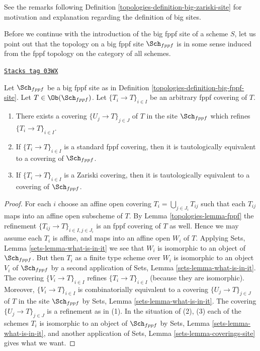 See the remarks following Definition \ref{topologies-definition-big-zariski-site}
for motivation and explanation regarding the definition of big sites.

\medskip\noindent
Before we continue with the introduction of the big fppf site of
a scheme $S$, let us point out that the topology on a big fppf site
$\Sch_{fppf}$ is in some sense induced from the fppf topology
on the category of all schemes.

\begin{lemma}
\label{topologies-lemma-fppf-induced}
\href{https://stacks.math.columbia.edu/tag/03WX}{\texttt{Stacks tag 03WX}}

Let $\Sch_{fppf}$ be a big fppf site as in
Definition \ref{topologies-definition-big-fppf-site}.
Let $T \in \Ob(\Sch_{fppf})$.
Let $\{T_i \to T\}_{i \in I}$ be an arbitrary fppf covering of $T$.
\begin{enumerate}
\item There exists a covering $\{U_j \to T\}_{j \in J}$ of $T$ in the site
$\Sch_{fppf}$ which refines $\{T_i \to T\}_{i \in I}$.
\item If $\{T_i \to T\}_{i \in I}$ is a standard fppf covering, then
it is tautologically equivalent to a covering of $\Sch_{fppf}$.
\item If $\{T_i \to T\}_{i \in I}$ is a Zariski covering, then
it is tautologically equivalent to a covering of $\Sch_{fppf}$.
\end{enumerate}
\end{lemma}

\begin{proof}

For each $i$ choose an affine open covering $T_i = \bigcup_{j \in J_i} T_{ij}$
such that each $T_{ij}$ maps into an affine open subscheme of $T$. By
Lemma \ref{topologies-lemma-fppf}
the refinement $\{T_{ij} \to T\}_{i \in I, j \in J_i}$ is an fppf covering
of $T$ as well. Hence we may assume each $T_i$ is affine, and maps into
an affine open $W_i$ of $T$. Applying
Sets, Lemma \ref{sets-lemma-what-is-in-it}
we see that $W_i$ is isomorphic to an object of $\Sch_{fppf}$.
But then $T_i$ as a finite type scheme over $W_i$
is isomorphic to an object $V_i$ of $\Sch_{fppf}$ by a second
application of
Sets, Lemma \ref{sets-lemma-what-is-in-it}.
The covering $\{V_i \to T\}_{i \in I}$ refines $\{T_i \to T\}_{i \in I}$
(because they are isomorphic).
Moreover, $\{V_i \to T\}_{i \in I}$ is combinatorially equivalent to a
covering $\{U_j \to T\}_{j \in J}$ of $T$ in the site
$\Sch_{fppf}$ by
Sets, Lemma \ref{sets-lemma-what-is-in-it}.
The covering $\{U_j \to T\}_{j \in J}$ is a refinement as in (1).
In the situation of (2), (3) each of the
schemes $T_i$ is isomorphic to an object of $\Sch_{fppf}$ by
Sets, Lemma \ref{sets-lemma-what-is-in-it},
and another application of
Sets, Lemma \ref{sets-lemma-coverings-site}
gives what we want.
\end{proof}

